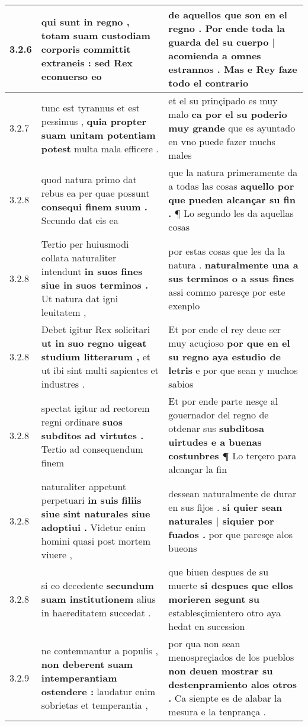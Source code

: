 \begin{tabular}{|p{1cm}|p{6.5cm}|p{6.5cm}|}
3.2.6 & qui sunt in regno , \textbf{ totam suam custodiam corporis committit extraneis : } sed Rex econuerso eo & de aquellos que son en el regno . \textbf{ Por ende toda la guarda del su cuerpo | acomienda a omnes estrannos . } Mas e Rey faze todo el contrario \\\hline
3.2.7 & tunc est tyrannus et est pessimus , \textbf{ quia propter suam unitam potentiam potest } multa mala efficere . & et el su prinçipado es muy malo \textbf{ ca por el su poderio muy grande } que es ayuntado en vno puede fazer muchs males \\\hline
3.2.8 & quod natura primo dat rebus ea per quae possunt \textbf{ consequi finem suum . } Secundo dat eis ea & que la natura primeramente da a todas las cosas \textbf{ aquello por que pueden alcançar su fin . } ¶ Lo segundo les da aquellas cosas \\\hline
3.2.8 & Tertio per huiusmodi collata naturaliter intendunt \textbf{ in suos fines siue in suos terminos . } Ut natura dat igni leuitatem , & por estas cosas que les da la natura . \textbf{ naturalmente una a sus terminos o a ssus fines } assi commo paresçe por este exenplo \\\hline
3.2.8 & Debet igitur Rex solicitari \textbf{ ut in suo regno uigeat studium litterarum , } et ut ibi sint multi sapientes et industres . & Et por ende el rey deue ser muy acuçioso \textbf{ por que en el su regno aya estudio de letris } e por que sean y muchos sabios \\\hline
3.2.8 & spectat igitur ad rectorem regni ordinare \textbf{ suos subditos ad virtutes . } Tertio ad consequendum finem & Et por ende parte nesçe al gouernador del regno de otdenar sus \textbf{ subditosa uirtudes e a buenas costunbres ¶ } Lo terçero para alcançar la fin \\\hline
3.2.8 & naturaliter appetunt perpetuari \textbf{ in suis filiis siue sint naturales siue adoptiui . } Videtur enim homini quasi post mortem viuere , & dessean naturalmente de durar en sus fijos . \textbf{ si quier sean naturales | siquier por fuados . } por que paresçe alos bueons \\\hline
3.2.8 & si eo decedente \textbf{ secundum suam institutionem } alius in haereditatem succedat . & que biuen despues de su muerte \textbf{ si despues que ellos morieren segunt su } establesçimientero otro aya hedat en sucession \\\hline
3.2.9 & ne contemnantur a populis , \textbf{ non deberent suam intemperantiam ostendere : } laudatur enim sobrietas et temperantia , & por qua non sean menospreçiados de los pueblos \textbf{ non deuen mostrar su destenpramiento alos otros . } Ca sienpte es de alabar la mesura e la tenprança . \\\hline

\end{tabular}
